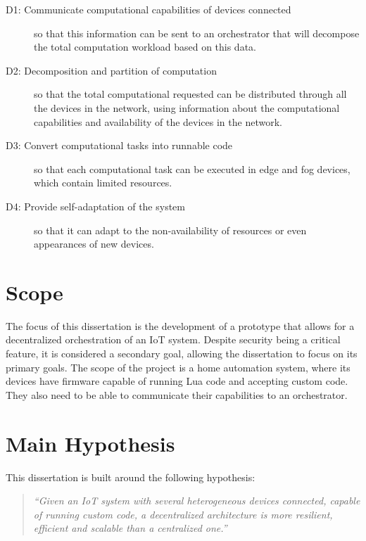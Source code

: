 \begin{description}
    \item [D1: Communicate computational capabilities of devices connected] so that this information can be sent to an orchestrator that will decompose the total computation workload based on this data.
    \item [D2: Decomposition and partition of computation] so that the total computational requested can be distributed through all the devices in the network, using information about the computational capabilities and availability of the devices in the network.
    \item [D3: Convert computational tasks into runnable code] so that each computational task can be executed in edge and fog devices, which contain limited resources.
    \item [D4: Provide self-adaptation of the system] so that it can adapt to the non-availability of resources or even appearances of new devices.
\end{description}

\section{Scope}\label{sec:scope}

The focus of this dissertation is the development of a prototype that allows for a decentralized orchestration of an IoT system. Despite security being a critical feature, it is considered a secondary goal, allowing the dissertation to focus on its primary goals. The scope of the project is a home automation system, where its devices have firmware capable of running Lua code and accepting custom code. They also need to be able to communicate their capabilities to an orchestrator.


\section{Main Hypothesis}\label{sec:main_hypothesis}

This dissertation is built around the following hypothesis:

\begin{quote}
    \emph{``Given an IoT system with several heterogeneous devices connected, capable of running custom code, a decentralized architecture is more resilient, efficient and scalable than a centralized one.''}
\end{quote}

